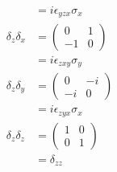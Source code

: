 \documentclass{article}
\begin{document}
\begin{enumerate}
\begin{align*}
                            & = i \epsilon_{y z x} \sigma_x \\
          \delta_z \delta_x & = \begin{pmatrix}
                                  0  & 1 \\
                                  -1 & 0
                                \end{pmatrix}              \\
                            & = i \epsilon_{z x y} \sigma_y \\
          \delta_z \delta_y & = \begin{pmatrix}
                                  0  & -i \\
                                  -i & 0
                                \end{pmatrix}              \\
                            & = i \epsilon_{z y x} \sigma_x \\
          \delta_z \delta_z & = \begin{pmatrix}
                                  1 & 0 \\
                                  0 & 1
                                \end{pmatrix}              \\
                            & = \delta_{z z}
        \end{align*}
\end{enumerate}

\subsection{}
\end{document}
